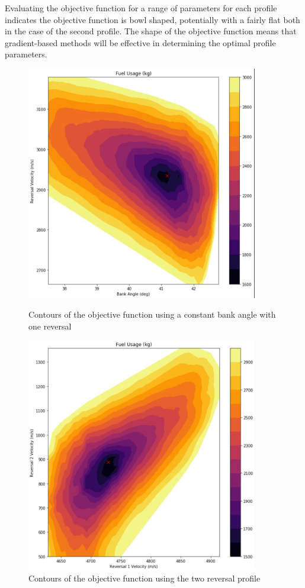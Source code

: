 \documentclass[]{article}
\begin{document}
Evaluating the objective function for a range of parameters for each profile indicates the objective function is bowl shaped, potentially with a fairly flat both in the case of the second profile. The shape of the objective function means that gradient-based methods will be effective in determining the optimal profile parameters. 

\begin{figure}[h!]
	   \begin{minipage}{0.45\textwidth}
		\centering
		\includegraphics[width=0.9\textwidth]{Profile1_Objective} %
		\caption{Contours of the objective function using a constant bank angle with one reversal}
	\end{minipage}\hfill
	\begin{minipage}{0.45\textwidth}
		\centering
		\includegraphics[width=0.9\textwidth]{Profile2_Objective} %
		\caption{Contours of the objective function using the two reversal profile}
	\end{minipage}
\end{figure}
\end{document}
